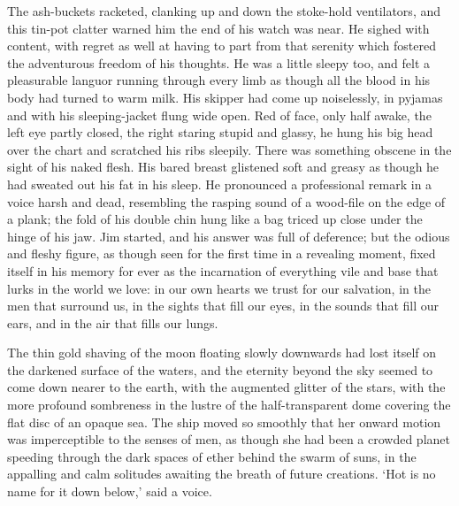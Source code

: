 The ash-buckets racketed, clanking up and down the stoke-hold ventilators, and this tin-pot clatter warned him the end of his watch was near. He sighed with content, with regret as well at having to part from that serenity which fostered the adventurous freedom of his thoughts. He was a little sleepy too, and felt a pleasurable languor running through every limb as though all the blood in his body had turned to warm milk. His skipper had come up noiselessly, in pyjamas and with his sleeping-jacket flung wide open. Red of face, only half awake, the left eye partly closed, the right staring stupid and glassy, he hung his big head over the chart and scratched his ribs sleepily. There was something obscene in the sight of his naked flesh. His bared breast glistened soft and greasy as though he had sweated out his fat in his sleep. He pronounced a professional remark in a voice harsh and dead, resembling the rasping sound of a wood-file on the edge of a plank; the fold of his double chin hung like a bag triced up close under the hinge of his jaw. Jim started, and his answer was full of deference; but the odious and fleshy figure, as though seen for the first time in a revealing moment, fixed itself in his memory for ever as the incarnation of everything vile and base that lurks in the world we love: in our own hearts we trust for our salvation, in the men that surround us, in the sights that fill our eyes, in the sounds that fill our ears, and in the air that fills our lungs.

The thin gold shaving of the moon floating slowly downwards had lost itself on the darkened surface of the waters, and the eternity beyond the sky seemed to come down nearer to the earth, with the augmented glitter of the stars, with the more profound sombreness in the lustre of the half-transparent dome covering the flat disc of an opaque sea. The ship moved so smoothly that her onward motion was imperceptible to the senses of men, as though she had been a crowded planet speeding through the dark spaces of ether behind the swarm of suns, in the appalling and calm solitudes awaiting the breath of future creations. ‘Hot is no name for it down below,’ said a voice.

